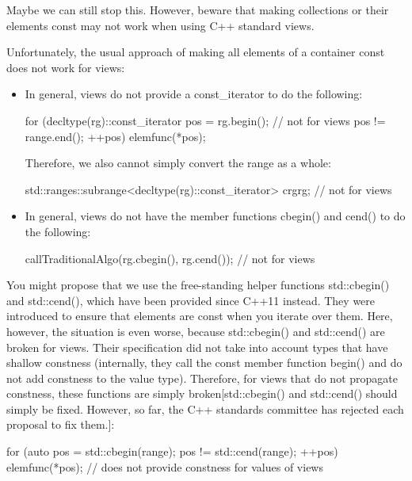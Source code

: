 Maybe we can still stop this. However, beware that making collections or their elements const may not work when using C++ standard views.


Unfortunately, the usual approach of making all elements of a container const does not work for views:

\begin{itemize}
\item
In general, views do not provide a const\_iterator to do the following:

\begin{cpp}
for (decltype(rg)::const_iterator pos = rg.begin(); // not for views
pos != range.end();
++pos) {
	elemfunc(*pos);
}
\end{cpp}

Therefore, we also cannot simply convert the range as a whole:

\begin{cpp}
std::ranges::subrange<decltype(rg)::const_iterator> crg{rg}; // not for views
\end{cpp}

\item
In general, views do not have the member functions cbegin() and cend() to do the following:

\begin{cpp}
callTraditionalAlgo(rg.cbegin(), rg.cend()); // not for views
\end{cpp}
\end{itemize}

You might propose that we use the free-standing helper functions std::cbegin() and std::cend(), which have been provided since C++11 instead. They were introduced to ensure that elements are const when you iterate over them. Here, however, the situation is even worse, because std::cbegin() and std::cend() are broken for views. Their specification did not take into account types that have shallow constness (internally, they call the const member function begin() and do not add constness to the value type). Therefore, for views that do not propagate constness, these functions are simply broken[std::cbegin() and std::cend() should simply be fixed. However, so far, the C++ standards committee has rejected each proposal to fix them.]:

\begin{cpp}
for (auto pos = std::cbegin(range); pos != std::cend(range); ++pos) {
	elemfunc(*pos); // does not provide constness for values of views
}
\end{cpp}

